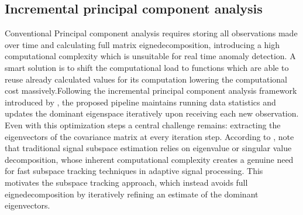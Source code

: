 \subsection{Incremental principal component analysis}
Conventional Principal component analysis requires storing all observations made over time and calculating full matrix eignedecomposition, introducing a high computational complexity which is unsuitable for real time anomaly detection. A smart solution is to shift the computational load to functions which are able to reuse already calculated values for its computation lowering the computational cost massively.Following the incremental principal component analysis framework introduced by \textcite{Incremental_PCA}, the proposed pipeline maintains running data statistics and updates the dominant eigenspace iteratively upon receiving each new observation.
Even with this optimization steps a central challenge remains: extracting the eigenvectors of the covariance matrix at every iteration step.  
According to \textcite[p.~2931]{1468483}, note that traditional signal subspace estimation relies on eigenvalue or singular value decomposition, whose inherent computational complexity creates a genuine need for fast subspace tracking techniques in adaptive signal processing. This motivates the subspace tracking approach, which instead avoids full eignedecomposition by iteratively refining an estimate of the dominant eigenvectors.